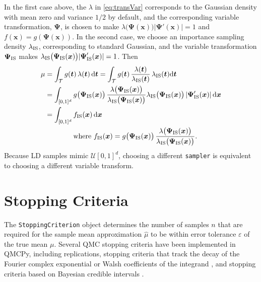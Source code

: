 \documentclass[graybox]{svmult}
\begin{document}
In the first case above, the $\lambda$ in \eqref{eq:transVar} corresponds to the Gaussian density  with mean zero and variance $1/2$ by default, and the corresponding variable transformation, $\boldsymbol{\Psi}$, is chosen to make $\lambda\bigl(\boldsymbol{\Psi}(\boldsymbol{x})\bigr) \lvert \boldsymbol{\Psi}'(\boldsymbol{x})\rvert  = 1$ and $f(\boldsymbol{x}) = g\left(\boldsymbol{\Psi}(\boldsymbol{x}) \right)$.  In the second case,  we choose an importance sampling density $\lambda_{\textup{IS}}$, corresponding  to standard  Gaussian, and the variable transformation $\boldsymbol{\Psi}_{\textup{IS}}$ makes $\lambda_\textup{IS}\bigl(\boldsymbol{\Psi}_{\textup{IS}}(\boldsymbol{x})\bigr) \lvert\boldsymbol{\Psi}'_{\textup{IS}}(\boldsymbol{x})\rvert  = 1$.  Then
\begin{align}
	\nonumber 
	\mu &= \int_\mathcal{T} g(\boldsymbol{t}) \, \lambda(\boldsymbol{t}) \, \D \boldsymbol{t}  = \int_\mathcal{T} g(\boldsymbol{t}) \, \frac{\lambda(\boldsymbol{t})}{\lambda_\textup{IS}(\boldsymbol{t}) } \, \lambda_\textup{IS}(\boldsymbol{t}) \D \boldsymbol{t}  \\ 
	\nonumber
	& =  \int_{[0,1]^d} g\bigl(\boldsymbol{\Psi}_\textup{IS}(\boldsymbol{x})\bigr) \, \frac{\lambda\bigl(\boldsymbol{\Psi}_\textup{IS}(\boldsymbol{x})\bigr)} {\lambda_\textup{IS}\bigl(\boldsymbol{\Psi}_\textup{IS}(\boldsymbol{x})\bigr) } \lambda_\textup{IS}\bigl(\boldsymbol{\Psi}_\textup{IS}(\boldsymbol{x})\bigr) \,\lvert\boldsymbol{\Psi}'_{\textup{IS}}(\boldsymbol{x})\rvert  \, \D \boldsymbol{x} \\
	\nonumber
	& =  \int_{[0,1]^d} f_\textup{IS}(\boldsymbol{x}) \, \D \boldsymbol{x}  \\
	\label{eq:transVarImp}
	& \qquad \qquad \text{where } f_\textup{IS}(\boldsymbol{x})  = g\bigl(\boldsymbol{\Psi}_\textup{IS}(\boldsymbol{x})\bigr)  \,  \frac{\lambda\bigl(\boldsymbol{\Psi}_\textup{IS}(\boldsymbol{x})\bigr)} {\lambda_\textup{IS}\bigl(\boldsymbol{\Psi}_\textup{IS}(\boldsymbol{x})\bigr) }.
\end{align}
Because LD samples mimic $\mathcal{U}[0,1]^d$, choosing a different \texttt{sampler} is equivalent to choosing a different variable transform.

\section{Stopping Criteria} \label{sec:stopping_crit}

The \texttt{StoppingCriterion} object determines the number of samples $n$ that are required for the sample mean approximation $\widehat{\mu}$ to be within error tolerance $\varepsilon$ of the true mean $\mu$.  Several QMC stopping criteria have been implemented in QMCPy, including replications, stopping criteria that track the decay of the Fourier complex exponential or Walsh coefficients of the integrand \cite{HicJim16a,HicEtal17a,JimHic16a}, and stopping criteria based on
Bayesian credible intervals \cite{RatHic19a,JagHic22a}. 
\end{document}
